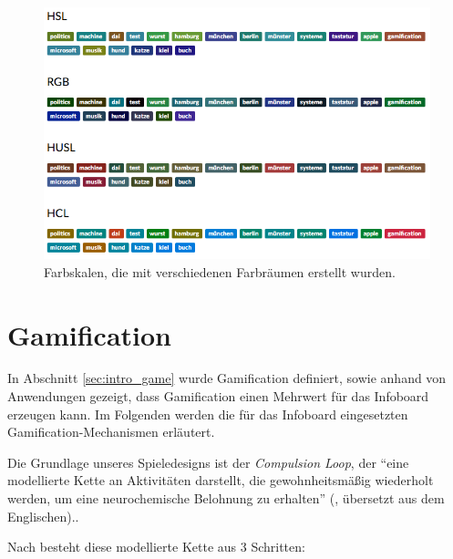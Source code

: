 \documentclass[12pt,twoside]{book}
\begin{document}
\begin{figure}[htbp]
    \centering
    \includegraphics[width=1.0\textwidth]{images/colors}
    \caption{Farbskalen, die mit verschiedenen Farbräumen erstellt wurden.}
    \label{fig:colors}
\end{figure}

\section{Gamification}\label{chap:game}


In Abschnitt \ref{sec:intro_game} wurde Gamification definiert, sowie anhand von Anwendungen gezeigt, dass Gamification einen Mehrwert für das Infoboard erzeugen kann. Im Folgenden werden die für das Infoboard eingesetzten Gamification-Mechanismen erläutert.

Die Grundlage unseres Spieledesigns ist der \textit{Compulsion Loop}, der ``eine modellierte Kette an Aktivitäten darstellt, die gewohnheitsmäßig wiederholt werden, um eine neurochemische Belohnung zu erhalten'' (\cite{gamasutra}, übersetzt aus dem Englischen)..

Nach \citep{gamasutra} besteht diese modellierte Kette aus 3 Schritten:
\end{document}
